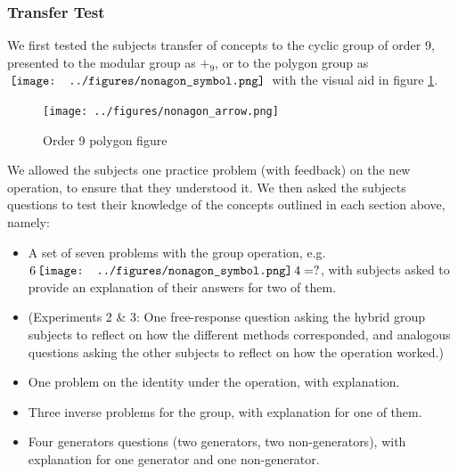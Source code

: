 \documentclass[man,10pt]{apa6}
\newcommand{\nonagon}{\,\vcenter{\hbox{\texttt{[image: ../figures/nonagon\_symbol.png]}}}\,}
\begin{document}
\subsubsection{Transfer Test}
We first tested the subjects transfer of concepts to the cyclic group of order 9, presented to the modular group as $+_9$, or to the polygon group as $\nonagon$ with the visual aid in figure \ref{nonagonex}. 
\begin{figure} \centering \texttt{[image: ../figures/nonagon\_arrow.png]} \caption{Order 9 polygon figure} \label{nonagonex} \end{figure} \noindent
We allowed the subjects one practice problem (with feedback) on the new operation, to ensure that they understood it. We then asked the subjects questions to test their knowledge of the concepts outlined in each section above, namely:
\begin{itemize} 
\item A set of seven problems with the group operation, e.g. $6 \nonagon 4 = ?$, with subjects asked to provide an explanation of their answers for two of them. 
\item (Experiments 2 \& 3: One free-response question asking the hybrid group subjects to reflect on how the different methods corresponded, and analogous questions asking the other subjects to reflect on how the operation worked.) 
\item One problem on the identity under the operation, with explanation.
\item Three inverse problems for the group, with explanation for one of them.
\item Four generators questions (two generators, two non-generators), with explanation for one generator and one non-generator.
\end{itemize}
\end{document}
